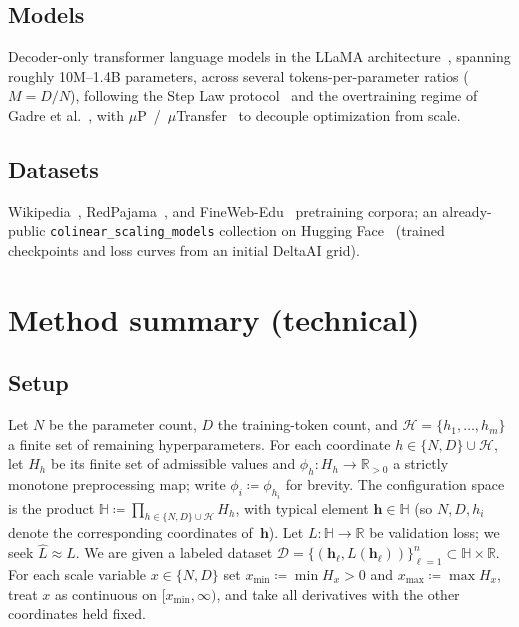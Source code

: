 \documentclass[11pt]{article}
\newcommand{\calD}{\mathcal{D}}
\newcommand{\calH}{\mathcal{H}}
\newcommand{\bbH}{\mathbb{H}}
\newcommand{\bbR}{\mathbb{R}}
\newcommand{\Lhat}{\hat{L}}
\begin{document}
\subsection{Models}\label{sec:models}
Decoder-only transformer language models in the LLaMA architecture~\citep{touvron2023llama}, spanning roughly 10M--1.4B parameters, across several tokens-per-parameter ratios ($M = D/N$), following the Step Law protocol~\citep{li2025steplaw} and the overtraining regime of Gadre et al.~\citep{gadre2024overtraining}, with $\mu$P~/~$\mu$Transfer~\citep{yang2022mup} to decouple optimization from scale.

\subsection{Datasets}\label{sec:datasets}
Wikipedia~\citep{wikimedia2023wikipedia}, RedPajama~\citep{together2023redpajama}, and FineWeb-Edu~\citep{penedo2024finewebedu} pretraining corpora; an already-public \texttt{colinear\_\allowbreak scaling\_\allowbreak models} collection on Hugging Face~\citep{kricheli2025colinear} (trained checkpoints and loss curves from an initial DeltaAI grid).

\section{Method summary (technical)}\label{sec:method}

\subsection{Setup}\label{sec:setup}
Let $N$ be the parameter count, $D$ the training-token count, and
$\calH = \{h_1, \ldots, h_m\}$ a finite set of remaining hyperparameters.
For each coordinate $h \in \{N, D\} \cup \calH$, let $H_h$ be its finite set of
admissible values and $\phi_h \colon H_h \to \bbR_{>0}$ a strictly monotone
preprocessing map; write $\phi_i \coloneqq \phi_{h_i}$ for brevity.
The configuration space is the product
$\bbH \coloneqq \prod_{h \in \{N,D\}\cup\calH} H_h$,
with typical element $\mathbf{h} \in \bbH$ (so $N, D, h_i$ denote the corresponding
coordinates of~$\mathbf{h}$).
Let $L \colon \bbH \to \bbR$ be validation loss; we seek $\Lhat \approx L$.
We are given a labeled dataset
$\calD = \{(\mathbf{h}_\ell, L(\mathbf{h}_\ell))\}_{\ell=1}^{n} \subset \bbH \times \bbR$.
For each scale variable $x \in \{N, D\}$ set
$x_{\min} \coloneqq \min H_x > 0$ and
$x_{\max} \coloneqq \max H_x$,
treat $x$ as continuous on
$[x_{\min}, \infty)$, and take all derivatives with the other coordinates held fixed.
\end{document}

